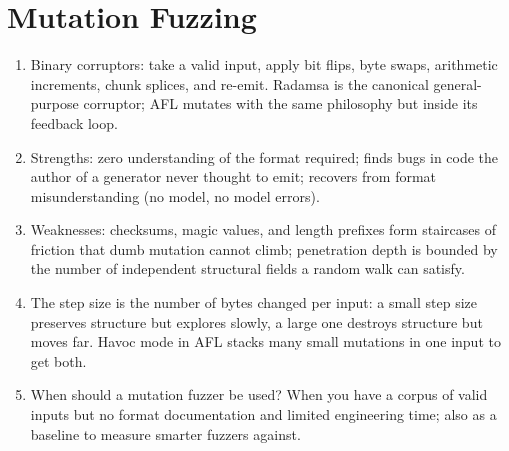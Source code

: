 \documentclass[12pt]{Training}
\begin{document}
\section*{Mutation Fuzzing}
\begin{enumerate}
    \item Binary corruptors: take a valid input, apply bit flips, byte swaps, arithmetic increments, chunk splices, and re-emit. Radamsa is the canonical general-purpose corruptor; AFL mutates with the same philosophy but inside its feedback loop.
	\item Strengths: zero understanding of the format required; finds bugs in code the author of a generator never thought to emit; recovers from format misunderstanding (no model, no model errors).
    \item Weaknesses: checksums, magic values, and length prefixes form staircases of friction that dumb mutation cannot climb; penetration depth is bounded by the number of independent structural fields a random walk can satisfy.
    \item The step size is the number of bytes changed per input: a small step size preserves structure but explores slowly, a large one destroys structure but moves far. Havoc mode in AFL stacks many small mutations in one input to get both.
    \item When should a mutation fuzzer be used? When you have a corpus of valid inputs but no format documentation and limited engineering time; also as a baseline to measure smarter fuzzers against.
\end{enumerate}
\end{document}
